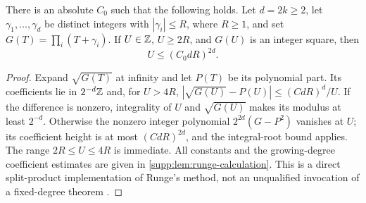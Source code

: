 \begin{lemma}\label{lem:runge}
There is an absolute $C_0$ such that the following holds. Let $d=2k\ge2$,
let $\gamma_1,\ldots,\gamma_d$ be distinct integers with
$|\gamma_i|\le R$, where $R\ge1$, and set $G(T)=\prod_i(T+\gamma_i)$.
If $U\in\mathbb Z$, $U\ge2R$, and $G(U)$ is an integer square, then
\begin{equation}\label{eq:runge-bound}
 U\le(C_0dR)^{2d}.
\end{equation}
\end{lemma}
\begin{proof}
Expand $\sqrt{G(T)}$ at infinity and let $P(T)$ be its polynomial part.
Its coefficients lie in $2^{-d}\mathbb Z$ and, for $U>4R$,
$|\sqrt{G(U)}-P(U)|\le(CdR)^d/U$.
If the difference is nonzero, integrality of $U$ and $\sqrt{G(U)}$ makes
its modulus at least $2^{-d}$. Otherwise the nonzero integer polynomial
$2^{2d}(G-P^2)$ vanishes at $U$; its coefficient height is at most
$(CdR)^{2d}$, and the integral-root bound applies. The range $2R\le U\le4R$
is immediate. All constants and the growing-degree coefficient estimates
are given in \cref{supp:lem:runge-calculation}. This is a direct
split-product implementation of Runge's method, not an unqualified
invocation of a fixed-degree theorem \cite{Runge1887,Walsh1992}.
\end{proof}

